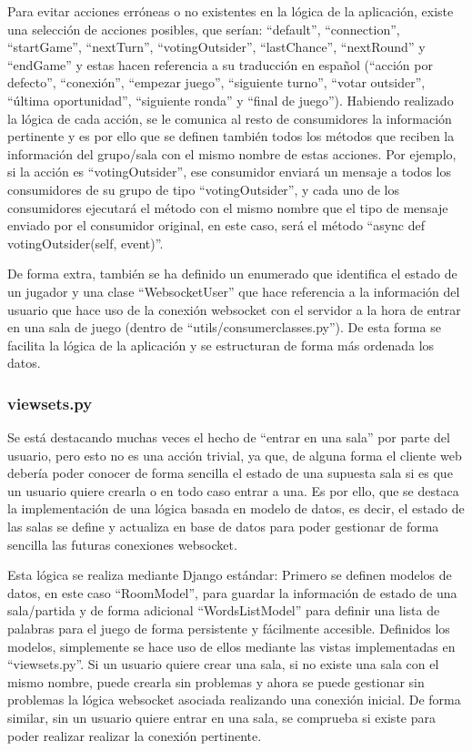 Para evitar acciones erróneas o no existentes en la lógica de la aplicación, existe una selección de acciones posibles, que serían: ``default'', ``connection'', 
``startGame'', ``nextTurn'', ``votingOutsider'', ``lastChance'', ``nextRound'' y ``endGame'' y estas hacen referencia a su traducción en español (``acción por defecto'', ``conexión'', 
``empezar juego'', ``siguiente turno'', ``votar outsider'', ``última oportunidad'', ``siguiente ronda'' y ``final de juego''). Habiendo realizado la lógica de cada
acción, se le comunica al resto de consumidores la información pertinente y es por ello que se definen también todos los métodos que reciben la información
del grupo/sala con el mismo nombre de estas acciones. Por ejemplo, si la acción es ``votingOutsider'', ese consumidor enviará un mensaje a todos los consumidores 
de su grupo de tipo ``votingOutsider'', y cada uno de los consumidores ejecutará el método con el mismo nombre que el tipo de mensaje enviado por el consumidor original,
en este caso, será el método ``async def votingOutsider(self, event)''.

De forma extra, también se ha definido un enumerado que identifica el estado de un jugador y una clase ``WebsocketUser'' que hace referencia a la información del usuario
que hace uso de la conexión websocket con el servidor a la hora de entrar en una sala de juego (dentro de ``utils/consumer\textunderscore classes.py''). De esta forma se 
facilita la lógica de la aplicación y se estructuran de forma más ordenada los datos.

\subsubsection{viewsets.py}
Se está destacando muchas veces el hecho de ``entrar en una sala'' por parte del usuario, pero esto no es una acción trivial, ya que, de alguna forma
el cliente web debería poder conocer de forma sencilla el estado de una supuesta sala si es que un usuario quiere crearla o en todo caso entrar a una. Es por ello, que se destaca la implementación
de una lógica basada en modelo de datos, es decir, el estado de las salas se define y actualiza en base de datos para poder gestionar de forma sencilla las futuras conexiones websocket.

Esta lógica se realiza mediante Django estándar: Primero se definen modelos de datos, en este caso ``RoomModel'', para guardar la información de estado de una sala/partida
y de forma adicional ``WordsListModel'' para definir una lista de palabras para el juego de forma persistente y fácilmente accesible. Definidos los modelos, simplemente se hace uso de ellos mediante
las vistas implementadas en ``viewsets.py''. Si un usuario quiere crear una sala, si no existe una sala con el mismo nombre, puede crearla sin problemas y ahora se puede gestionar sin problemas
la lógica websocket asociada realizando una conexión inicial. De forma similar, sin un usuario quiere entrar en una sala, se comprueba si existe para poder realizar realizar la conexión pertinente.

